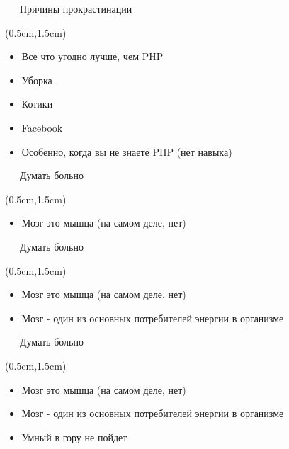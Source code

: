 \documentclass[xetex,18pt,aspectratio=43]{beamer}
\begin{document}
\begin{Large}
\begin{frame}{\ \ \ Причины прокрастинации}
\begin{textblock*}{\framewidth-0.8cm}(0.5cm,1.5cm)
\begin{itemize}
  \item Все что угодно лучше, чем PHP
  \item Уборка
  \item Котики
  \item Facebook
  \item Особенно, когда вы не знаете PHP (нет навыка)
\end{itemize}
\end{textblock*}
\end{frame}

\begin{frame}{\ \ \ Думать больно}
\begin{textblock*}{\framewidth-0.8cm}(0.5cm,1.5cm)
\begin{itemize}
  \item Мозг это мышца (на самом деле, нет)
\end{itemize}
\end{textblock*}
\end{frame}

\begin{frame}{\ \ \ Думать больно}
\begin{textblock*}{\framewidth-0.8cm}(0.5cm,1.5cm)
\begin{itemize}
  \item Мозг это мышца (на самом деле, нет)
  \item Мозг - один из основных потребителей энергии в организме
\end{itemize}
\end{textblock*}
\end{frame}

\begin{frame}{\ \ \ Думать больно}
\begin{textblock*}{\framewidth-0.8cm}(0.5cm,1.5cm)
\begin{itemize}
  \item Мозг это мышца (на самом деле, нет)
  \item Мозг - один из основных потребителей энергии в организме
  \item Умный в гору не пойдет
\end{itemize}
\end{textblock*}
\end{frame}


\end{Large}
\end{document}

